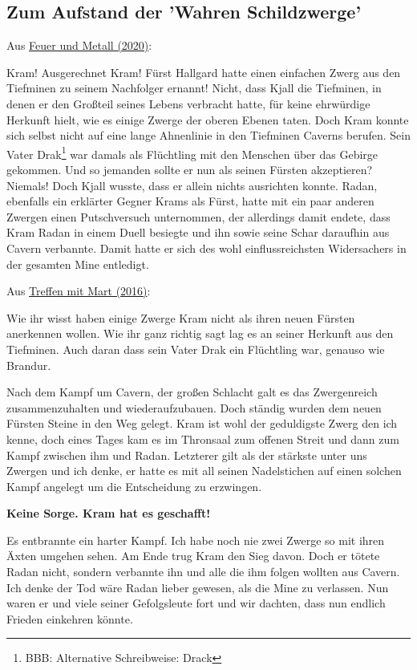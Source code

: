 \documentclass[10pt, a4paper, oneside]{book}
\newcommand{\refstorytext}[1]{\hyperref[Storytext: #1]{#1}}
\begin{document}
\begin{multicols}{2}
\newpage %
\section{Zum Aufstand der 'Wahren Schildzwerge'}

\begin{center}
    Aus \refstorytext{Feuer und Metall (2020)}:
\end{center}

Kram! Ausgerechnet Kram! Fürst Hallgard hatte einen einfachen Zwerg aus den Tiefminen zu seinem Nachfolger ernannt! Nicht, dass Kjall die Tiefminen, in denen er den Großteil seines Lebens verbracht hatte, für keine ehrwürdige Herkunft hielt, wie es einige Zwerge der oberen Ebenen taten. Doch Kram konnte sich selbst nicht auf eine lange Ahnenlinie in den Tiefminen Caverns berufen. Sein Vater Drak\footnote{BBB: Alternative Schreibweise: Drack} war damals als Flüchtling mit den Menschen über das Gebirge gekommen. Und so jemanden sollte er nun als seinen Fürsten akzeptieren? Niemals! Doch Kjall wusste, dass er allein nichts ausrichten konnte. Radan, ebenfalls ein erklärter Gegner Krams als Fürst, hatte mit ein paar anderen Zwergen einen Putschversuch unternommen, der allerdings damit endete, dass Kram Radan in einem Duell besiegte und ihn sowie seine Schar daraufhin aus Cavern verbannte. Damit hatte er sich des wohl einflussreichsten Widersachers in der gesamten Mine entledigt.

\begin{center}
    Aus \refstorytext{Treffen mit Mart (2016)}:
\end{center}



Wie ihr wisst haben einige Zwerge Kram nicht als ihren neuen Fürsten anerkennen wollen. Wie ihr ganz richtig sagt lag es an seiner Herkunft aus den Tiefminen. Auch daran dass sein Vater Drak ein Flüchtling war, genauso wie Brandur.

Nach dem Kampf um Cavern, der großen Schlacht galt es das Zwergenreich zusammenzuhalten und wiederaufzubauen. Doch ständig wurden dem neuen Fürsten Steine in den Weg gelegt. Kram ist wohl der geduldigste Zwerg den ich kenne, doch eines Tages kam es im Thronsaal zum offenen Streit und dann zum Kampf zwischen ihm und Radan. Letzterer gilt als der stärkste unter uns Zwergen und ich denke, er hatte es mit all seinen Nadelstichen auf einen solchen Kampf angelegt um die Entscheidung zu erzwingen.

\textbf{Keine Sorge. Kram hat es geschafft!}

Es entbrannte ein harter Kampf. Ich habe noch nie zwei Zwerge so mit ihren Äxten umgehen sehen. Am Ende trug Kram den Sieg davon. Doch er tötete Radan nicht, sondern verbannte ihn und alle die ihm folgen wollten aus Cavern. Ich denke der Tod wäre Radan lieber gewesen, als die Mine zu verlassen. Nun waren er und viele seiner Gefolgsleute fort und wir dachten, dass nun endlich Frieden einkehren könnte.


\columnbreak
\textbf{ }
\vfill

\end{multicols}
\end{document}

